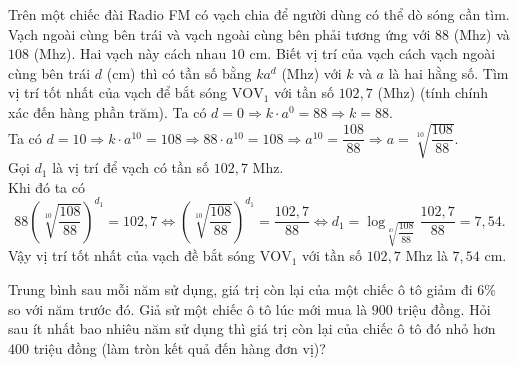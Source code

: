 \begin{bt}%

Trên một chiếc đài Radio FM có vạch chia để người dùng có thể dò sóng cần tìm. Vạch ngoài cùng bên trái và vạch ngoài cùng bên phải tương ứng với $88$ (Mhz) và $108$ (Mhz). Hai vạch này cách nhau $10$ cm. Biết vị trí của vạch cách vạch ngoài cùng bên trái $d$ (cm) thì có tần số bằng $ka^d$ (Mhz) với $k$ và $a$ là hai hằng số. Tìm vị trí tốt nhất của vạch để bắt sóng $\mathrm{VOV}_1$ với tần số $102{,}7$ (Mhz) (tính chính xác đến hàng phần trăm).
\loigiai
{
Ta có	$d=0 \Rightarrow k\cdot a^0=88 \Rightarrow k=88$. \\
Ta có $d=10 \Rightarrow k\cdot a^{10}=108 \Rightarrow 88\cdot a^{10}=108 \Rightarrow a^{10}=\dfrac{108}{88} \Rightarrow a=\sqrt[10]{\dfrac{108}{88}}$.\\
Gọi $d_1$ là vị trí để vạch có tần số $102{,}7$ Mhz. \\
Khi đó ta có
$$88\left(\sqrt[10]{\dfrac{108}{88}}\right)^{d_1}=102{,}7 \Leftrightarrow\left(\sqrt[10]{\dfrac{108}{88}}\right)^{d_1}=\dfrac{102{,}7}{88} \Leftrightarrow d_1=\log _{\sqrt[10]{\dfrac{108}{88}}} \dfrac{102{,}7}{88}=7{,}54.$$
Vậy vị trí tốt nhất của vạch đề bắt sóng $\mathrm{VOV}_1$ với tần số $102{,}7$ Mhz là $7{,}54$ cm.		
}
\end{bt}

\begin{bt}%

	Trung bình sau mỗi năm sử dụng, giá trị còn lại của một chiếc ô tô giảm đi $6 \%$ so với năm trước đó. Giả sử một chiếc ô tô lúc mới mua là $900$ triệu đồng. Hỏi sau ít nhất bao nhiêu năm sử dụng thì giá trị còn lại của chiếc ô tô đó nhỏ hơn $400$ triệu đồng (làm tròn kết quả đến hàng đơn vị)?
\end{bt}

